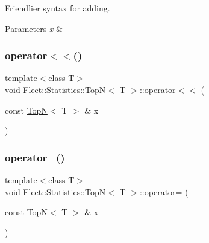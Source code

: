 Friendlier syntax for adding. 
\begin{DoxyParams}{Parameters}
{\em x} & \\
\hline
\end{DoxyParams}
\mbox{\label{class_fleet_1_1_statistics_1_1_top_n_a73cb4911b6dc2bdc56f466ca4b93ef9d}} 
\subsubsection{\texorpdfstring{operator$<$$<$()}{operator<<()}\hspace{0.1cm}{\footnotesize\ttfamily [2/2]}}
{\footnotesize\ttfamily template$<$class T$>$ \\
void \hyperlink{class_fleet_1_1_statistics_1_1_top_n}{Fleet\+::\+Statistics\+::\+TopN}$<$ T $>$\+::operator$<$$<$ (\begin{DoxyParamCaption}\item[{const \hyperlink{class_fleet_1_1_statistics_1_1_top_n}{TopN}$<$ T $>$ \&}]{x }\end{DoxyParamCaption})\hspace{0.3cm}{\ttfamily [inline]}}

\mbox{\label{class_fleet_1_1_statistics_1_1_top_n_a38d3aba302a215992c603ff2ab13e8fc}} 
\subsubsection{\texorpdfstring{operator=()}{operator=()}\hspace{0.1cm}{\footnotesize\ttfamily [1/2]}}
{\footnotesize\ttfamily template$<$class T$>$ \\
void \hyperlink{class_fleet_1_1_statistics_1_1_top_n}{Fleet\+::\+Statistics\+::\+TopN}$<$ T $>$\+::operator= (\begin{DoxyParamCaption}\item[{const \hyperlink{class_fleet_1_1_statistics_1_1_top_n}{TopN}$<$ T $>$ \&}]{x }\end{DoxyParamCaption})\hspace{0.3cm}{\ttfamily [inline]}}

